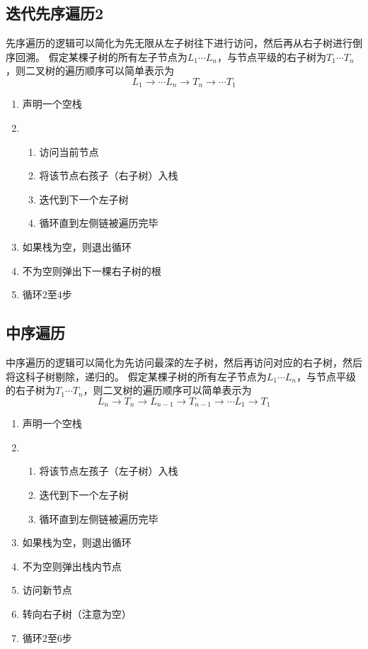 \documentclass{article}
\begin{document}
\subsection{迭代先序遍历2}

先序遍历的逻辑可以简化为先无限从左子树往下进行访问，然后再从右子树进行倒序回溯。
假定某棵子树的所有左子节点为$L_1 \cdots L_n$，与节点平级的右子树为$T_1 \cdots T_n$，则二叉树的遍历顺序可以简单表示为
$$L_1 \rightarrow \cdots L_n \rightarrow T_n \rightarrow \cdots T_1$$

\begin{enumerate}
  \item 声明一个空栈
  \item \begin{enumerate}
          \item 访问当前节点
          \item 将该节点右孩子（右子树）入栈
          \item 迭代到下一个左子树
          \item 循环直到左侧链被遍历完毕
        \end{enumerate}
  \item 如果栈为空，则退出循环
  \item 不为空则弹出下一棵右子树的根
  \item 循环2至4步
\end{enumerate}

\subsection{中序遍历}

中序遍历的逻辑可以简化为先访问最深的左子树，然后再访问对应的右子树，然后将这科子树剔除，递归的。
假定某棵子树的所有左子节点为$L_1 \cdots L_n$，与节点平级的右子树为$T_1 \cdots T_n$，则二叉树的遍历顺序可以简单表示为
$$L_n \rightarrow T_n \rightarrow L_{n-1} \rightarrow T_{n-1} \rightarrow \cdots L_1 \rightarrow T_1$$

\begin{enumerate}
  \item 声明一个空栈
  \item \begin{enumerate}
          \item 将该节点左孩子（左子树）入栈
          \item 迭代到下一个左子树
          \item 循环直到左侧链被遍历完毕
        \end{enumerate}
  \item 如果栈为空，则退出循环
  \item 不为空则弹出栈内节点
  \item 访问新节点
  \item 转向右子树（注意为空）
  \item 循环2至6步
\end{enumerate}
\end{document}
